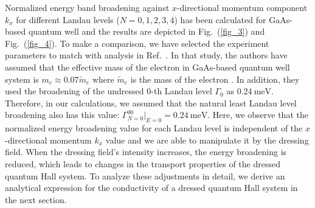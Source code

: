 Normalized energy band broadening against $x$-directional momentum component ${k_x}$ for different Landau levels ($N = 0,1,2,3,4$) has been calculated for GaAs-based quantum well and the results are depicted in Fig.~(\ref{fig_3}) and Fig.~(\ref{fig_4}). To make a comparison, we have selected the experiment parameters to match with analysis in Ref.~\cite{endo09}.
In that study, the authors have assumed that the effective mass of the electron in GaAs-based quantum well system is $m_e \approx 0.07\widetilde{m}_e$ where $\widetilde{m}_e$ is the mass of the electron \cite{endo09,winkler03,wackerl20}. In addition, they used the broadening of the undressed $0$-th Landau level $\Gamma_0$ as $\SI{0.24}{\milli\eV}$. Therefore, in our calculations, we assumed that the natural least Landau level broadening also has this value: $\Gamma^{00}_{N=0}|_{E=0} = \SI{0.24}{\milli\eV}$.
Here, we observe that the normalized energy broadening value for each Landau level is independent of the $x$-directional momentum $k_x$ value and we are able to manipulate it by the dressing field. When the dressing field's intensity increases, the energy broadening is reduced, which leads to changes in the transport properties of the dressed quantum Hall system.
To analyze these adjustments in detail, we derive an analytical expression for the conductivity of a dressed quantum Hall system in the next section.

